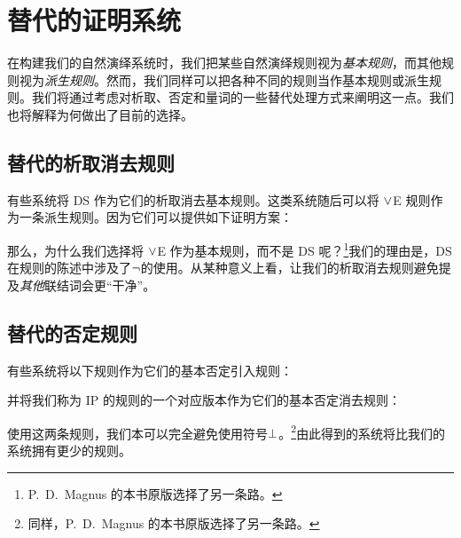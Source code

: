 
\chapter{替代的证明系统}
在构建我们的自然演绎系统时，我们把某些自然演绎规则视为\emph{基本规则}，而其他规则视为\emph{派生规则}。然而，我们同样可以把各种不同的规则当作基本规则或派生规则。我们将通过考虑对析取、否定和量词的一些替代处理方式来阐明这一点。我们也将解释为何做出了目前的选择。

\section{替代的析取消去规则}
有些系统将 DS 作为它们的析取消去基本规则。这类系统随后可以将 $\vee$E 规则作为一条派生规则。因为它们可以提供如下证明方案：
\begin{fitchproof}
  \open
     \AS
  \close
  \open
     \AS
  \close
  \open
     \AS
    \open
       \AS
    \close
  \close
\end{fitchproof}
那么，为什么我们选择将 $\vee$E 作为基本规则，而不是 DS 呢？\footnote{P.~D.\ Magnus 的本书原版选择了另一条路。}我们的理由是，DS 在规则的陈述中涉及了$\neg$的使用。从某种意义上看，让我们的析取消去规则避免提及\emph{其他}联结词会更“干净”。


\section{替代的否定规则}
有些系统将以下规则作为它们的基本否定引入规则：
\begin{fitchproof}
	\open
		\AS
	\close
\end{fitchproof}
并将我们称为 IP 的规则的一个对应版本作为它们的基本否定消去规则：
\begin{fitchproof}
	\open
		 \AS
	\close
\end{fitchproof}
使用这两条规则，我们本可以完全避免使用符号$\bot$。\footnote{同样，P.~D.\ Magnus 的本书原版选择了另一条路。}由此得到的系统将比我们的系统拥有更少的规则。

